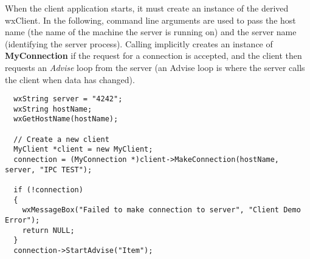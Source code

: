 When the client application starts, it must create an instance of
the derived wxClient. In the following, command line arguments
are used to pass the host name (the name of the machine the
server is running on) and the server name (identifying the server
process). Calling
\rtfsp
implicitly creates an instance of {\bf MyConnection} if the
request for a connection is accepted, and the client then
requests an {\it Advise} loop from the server (an Advise loop is
where the server calls the client when data has changed).

\begin{verbatim}
  wxString server = "4242";
  wxString hostName;
  wxGetHostName(hostName);

  // Create a new client
  MyClient *client = new MyClient;
  connection = (MyConnection *)client->MakeConnection(hostName, server, "IPC TEST");

  if (!connection)
  {
    wxMessageBox("Failed to make connection to server", "Client Demo Error");
    return NULL;
  }
  connection->StartAdvise("Item");
\end{verbatim}

